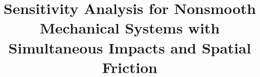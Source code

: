 \newcommand{\mytitle}{Sensitivity Analysis for Nonsmooth Mechanical Systems with Simultaneous Impacts and Spatial Friction}
\title{\mytitle}






\pagestyle{plain} %




\pagestyle{plain}
\tableofcontents







\cleartooddpage
\pagestyle{plain}








